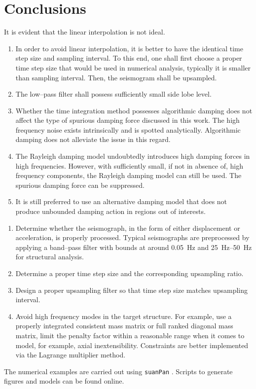 \section{Conclusions}
It is evident that the linear interpolation is not ideal.
\begin{enumerate}
\item In order to avoid linear interpolation, it is better to have the identical time step size and sampling interval. To this end, one shall first choose a proper time step size that would be used in numerical analysis, typically it is smaller than sampling interval. Then, the seismogram shall be upsampled.
\item The low--pass filter shall possess sufficiently small side lobe level.
\item Whether the time integration method possesses algorithmic damping does not affect the type of spurious damping force discussed in this work. The high frequency noise exists intrinsically and is spotted analytically. Algorithmic damping does not alleviate the issue in this regard.
\item The Rayleigh damping model undoubtedly introduces high damping forces in high frequencies. However, with sufficiently small, if not in absence of, high frequency components, the Rayleigh damping model can still be used. The spurious damping force can be suppressed.
\item It is still preferred to use an alternative damping model that does not produce unbounded damping action in regions out of interests.
\end{enumerate}

\begin{enumerate}
\item Determine whether the seismograph, in the form of either displacement or acceleration, is properly processed. Typical seismographs are preprocessed by applying a band--pass filter with bounds at around \SI{0.05}{\hertz} and \SIrange{25}{50}{\hertz} for structural analysis.
\item Determine a proper time step size and the corresponding upsampling ratio.
\item Design a proper upsampling filter so that time step size matches upsampling interval.
\item Avoid high frequency modes in the target structure. For example, use a properly integrated consistent mass matrix or full ranked diagonal mass matrix, limit the penalty factor within a reasonable range when it comes to model, for example, axial inextensibility. Constraints are better implemented via the Lagrange multiplier method.
\end{enumerate}

The numerical examples are carried out using \texttt{suanPan} \citep{Chang2022}. Scripts to generate figures and models can be found online.